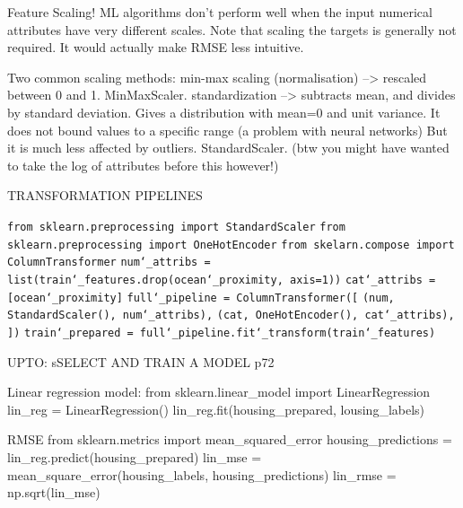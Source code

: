 Feature Scaling!
ML algorithms don't perform well when the input numerical attributes have very different scales.
Note that scaling the targets is generally not required. It would actually make RMSE less intuitive.

Two common scaling methods:
min-max scaling (normalisation) --> rescaled between 0 and 1. MinMaxScaler.
standardization --> subtracts mean, and divides by standard deviation.
Gives a distribution with mean=0 and unit variance.
It does not bound values to a specific range (a problem with neural networks)
But it is much less affected by outliers. StandardScaler.
(btw you might have wanted to take the log of attributes before this however!)


TRANSFORMATION PIPELINES

\texttt{from sklearn.preprocessing import StandardScaler}\newline
\texttt{from sklearn.preprocessing import OneHotEncoder}\newline
\texttt{from skelarn.compose import ColumnTransformer}\newline
\newline
\texttt{num\char`_attribs = list(train\char`_features.drop(\textquotesingle ocean\char`_proximity\textquotesingle, axis=1))}\newline
\texttt{cat\char`_attribs = [\textquotesingle ocean\char`_proximity\textquotesingle]}\newline
\newline
\texttt{full\char`_pipeline = ColumnTransformer([}\newline
\texttt{(\textquotesingle num\textquotesingle, StandardScaler(), num\char`_attribs),}\newline
\texttt{(\textquotesingle cat\textquotesingle, OneHotEncoder(), cat\char`_attribs),}\newline
\texttt{])}\newline
\newline
\texttt{train\char`_prepared = full\char`_pipeline.fit\char`_transform(train\char`_features)}


UPTO: sSELECT AND TRAIN A MODEL p72

Linear regression model:
from sklearn.linear_model import LinearRegression
lin_reg = LinearRegression()
lin_reg.fit(housing_prepared, lousing_labels)

RMSE
from sklearn.metrics import mean_squared_error
housing_predictions = lin_reg.predict(housing_prepared)
lin_mse = mean_square_error(housing_labels, housing_predictions)
lin_rmse = np.sqrt(lin_mse)


